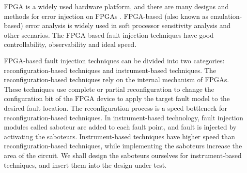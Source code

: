 FPGA is a widely used hardware platform, and there are many 
designs and methods for error injection on FPGAs 
\cite{Ebrahimi2014A}\cite{Lopez2007A}
\cite{Harward2015Estimating}\cite{Tarrillo2015Multiple}. 
FPGA-based (also known as emulation-based) error analysis 
is widely used in soft processor sensitivity analysis and 
other scenarios. The FPGA-based fault injection techniques 
have good controllability, observability and ideal speed.

FPGA-based fault injection techniques can be divided into 
two categories: reconfiguration-based techniques and 
instrument-based techniques. The reconfiguration-based 
techniques rely on the internal mechanism of FPGAs. These 
techniques use complete or partial reconfiguration to 
change the configuration bit of the FPGA device to apply 
the target fault model to the desired fault location. The 
reconfiguration process is a speed bottleneck for 
reconfiguration-based techniques. In instrument-based 
technology, fault injection modules called saboteur are 
added to each fault point, and fault is injected by 
activating the saboteurs. Instrument-based techniques have 
higher speed than reconfiguration-based techniques, while 
implementing the saboteurs increase the area of the circuit. 
We shall design the saboteurs ourselves for 
instrument-based techniques, and insert them into the 
design under test.